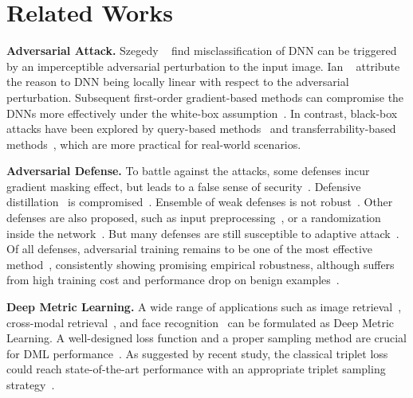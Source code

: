 \documentclass[10pt,twocolumn,letterpaper]{article}
\newcommand{\oo}[1]{\textcolor{orange}{#1}}
\begin{document}
\section{Related Works}
\label{sec:2}

\begin{comment}
\oo{In potential of future works}
Deep metric learning on adversarial example is also used for improving
adversarial robustness for deep classifiers~\cite{mao2019metric}.
\end{comment}

\textbf{Adversarial Attack.}
%
Szegedy \etal~\cite{l-bfgs} find misclassification of DNN can be triggered by
an imperceptible adversarial perturbation to the input image.
%
Ian \etal~\cite{fgsm} attribute the reason to DNN being locally linear with
respect to the adversarial perturbation.
%
Subsequent first-order gradient-based methods can compromise the DNNs more
effectively under the white-box assumption~\cite{i-fgsm,madry,apgd}.
%
In contrast, black-box attacks have been explored by query-based
methods~\cite{nes-atk,spsa-atk} and transferrability-based
methods~\cite{di-fgsm}, which are more practical for real-world scenarios.

\textbf{Adversarial Defense.}
%
To battle against the attacks, some defenses incur gradient masking
effect, but leads to a false sense of security~\cite{obfuscated}.
%
Defensive distillation~\cite{distill2} is compromised~\cite{cw}.
%
Ensemble of weak defenses is not robust~\cite{ensembleweak}.
%
Other defenses are also proposed, such as input
preprocessing~\cite{deflecting}, or a randomization inside the
network~\cite{self-ensemble}.
%
But many defenses are still susceptible to adaptive attack~\cite{adaptive}.
%
Of all defenses, adversarial training remains to be one of the most effective
method~\cite{bilateral,advtrain-triplet,benchmarking}, consistently showing
promising empirical robustness, although suffers from high training
cost and performance drop on benign examples~\cite{odds}.

\textbf{Deep Metric Learning.}
%
A wide range of applications such as image retrieval~\cite{imagesim2},
cross-modal retrieval~\cite{ladderloss}, and face recognition~\cite{facenet}
can be formulated as Deep Metric Learning.
%
A well-designed loss function and a proper sampling method are crucial for DML
performance~\cite{dmlreality}.  As suggested by recent study, the classical
triplet loss could reach state-of-the-art performance with an appropriate
triplet sampling strategy~\cite{revisiting}.
\end{document}
